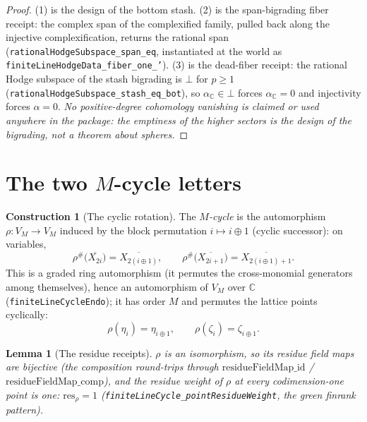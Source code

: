 \documentclass[11pt,a4paper]{article}
\theoremstyle{plain}
\newtheorem{lemma}[theorem]{Lemma}
\theoremstyle{definition}
\newtheorem{construction}[theorem]{Construction}
\newcommand{\C}{\mathbb{C}}
\begin{document}
\begin{proof}
(1) is the design of the bottom stash.  (2) is the span-bigrading
fiber receipt: the complex span of the complexified family, pulled
back along the injective complexification, returns the rational span
(\texttt{rationalHodgeSubspace\_span\_eq}, instantiated at the world as
\texttt{finiteLineHodgeData\_fiber\_one\_'}).  (3) is the dead-fiber
receipt: the rational Hodge subspace of the stash bigrading is $\bot$
for $p \ge 1$ (\texttt{rationalHodgeSubspace\_stash\_eq\_bot}), so
$\alpha_\C \in \bot$ forces $\alpha_\C = 0$ and injectivity forces
$\alpha = 0$.  \emph{No positive-degree cohomology vanishing is
claimed or used anywhere in the package: the emptiness of the higher
sectors is the design of the bigrading, not a theorem about spheres.}
\end{proof}

\section{The two $M$-cycle letters}\label{sec:letters}

\begin{construction}[The cyclic rotation]\label{con:rotation}
The \emph{$M$-cycle} is the automorphism $\rho : V_M \to V_M$
induced by the block permutation $i \mapsto i \oplus 1$ (cyclic
successor): on variables,
\[
\rho^\#\bigl(\overline{X_{2i}}\bigr) = \overline{X_{2(i\oplus 1)}},
\qquad
\rho^\#\bigl(\overline{X_{2i+1}}\bigr) = \overline{X_{2(i\oplus
1)+1}} .
\]
This is a graded ring automorphism (it permutes the cross-monomial
generators among themselves), hence an automorphism of $V_M$ over
$\C$ (\texttt{finiteLineCycleEndo}); it has order $M$ and permutes
the lattice points cyclically:
\[
\rho(\eta_i) = \eta_{i \oplus 1}, \qquad \rho(\zeta_i) = \zeta_{i
\oplus 1}.
\]
\end{construction}

\begin{lemma}[The residue receipts]\label{lem:residue}
$\rho$ is an isomorphism, so its residue field maps are bijective
(the composition round-trips through
$\mathrm{residueFieldMap\_id}$ / $\mathrm{residueFieldMap\_comp}$),
and the residue weight of $\rho$ at every codimension-one point is
one: $\mathrm{res}_{\rho} = 1$
(\texttt{finiteLineCycle\_pointResidueWeight}, the green finrank
pattern).
\end{lemma}
\end{document}
